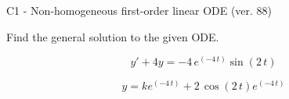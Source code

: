 \begin{exercise}
  \begin{exerciseTitle}C1 - Non-homogeneous first-order linear ODE (ver. 88)\end{exerciseTitle}
  \begin{exerciseStatement}
    
Find the general solution to the given ODE.

    
\[y'+4y= -4 \, e^{\left(-4 \, t\right)} \sin\left(2 \, t\right)\]

  \end{exerciseStatement}
  \begin{exerciseAnswer}
    
\[y= k e^{\left(-4 \, t\right)} + 2 \, \cos\left(2 \, t\right) e^{\left(-4 \, t\right)}\]

  \end{exerciseAnswer}
\end{exercise}